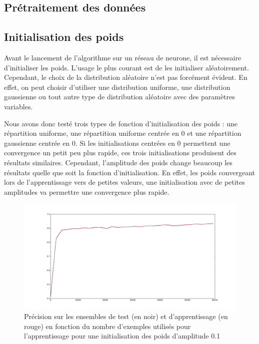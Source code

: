 \documentclass{report}
\begin{document}
\subsection{Prétraitement des données}


\subsection{Initialisation des poids}
Avant le lancement de l'algorithme sur un réseau de neurone, il est nécessaire d'initialiser les poids.	L'usage le plus courant est de les initialiser aléatoirement. Cependant, le choix de la distribution aléatoire n'est pas forcément évident. En effet, on peut choisir d'utiliser une distribution uniforme, une distribution gaussienne ou tout autre type de distribution aléatoire avec des paramètres variables.

Nous avons donc testé trois types de fonction d'initialisation des poids : une répartition uniforme, une répartition uniforme centrée en 0  et une répartition gaussienne centrée en 0.
Si les initialisations centrées en 0 permettent une convergence un petit peu plus rapide, ces trois initialisations produisent des résultats similaires. Cependant, l'amplitude des poids change beaucoup les résultats quelle que soit la fonction d'initialisation. En effet, les poids convergeant lors de l'apprentissage vers de petites valeurs, une initialisation avec de petites amplitudes va permettre une convergence plus rapide.

\begin{figure}[!h]
\begin{center}
\includegraphics[scale=0.2]{images/initialisationpoids_amplitude01.png}
\caption{Précision sur les ensembles de test (en noir) et d'apprentissage (en rouge) en fonction du nombre d'exemples utilisés pour l'apprentissage pour une initialisation des poids d'amplitude 0.1 }
\label{initialisationpoids_amplitude0.1}
\end{center}
\end{figure}
\end{document}
